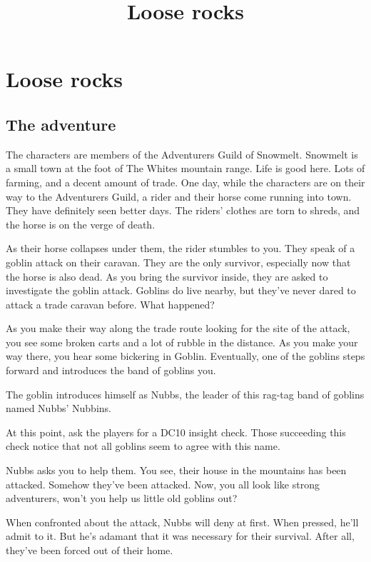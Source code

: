 \documentclass[10pt,twoside,twocolumn,openany,nodeprecatedcode,a4paper,bg=none]{dndbook}
\title{Loose rocks}
\begin{document}
\section{Loose rocks}
\subsection{The adventure}
The characters are members of the Adventurers Guild of Snowmelt. Snowmelt is a
small town at the foot of The Whites mountain range. Life is good here. Lots of
farming, and a decent amount of trade. One day, while the characters are on
their way to the Adventurers Guild, a rider and their horse come running into
town. They have definitely seen better days. The riders' clothes are torn to
shreds, and the horse is on the verge of death.

\begin{DndReadAloud}
  As their horse collapses under them, the rider stumbles to you. They speak of
  a goblin attack on their caravan. They are the only survivor, especially now
  that the horse is also dead. As you bring the survivor inside, they are asked
  to investigate the goblin attack. Goblins do live nearby, but they've never
  dared to attack a trade caravan before. What happened?

  As you make their way along the trade route looking for the site of the
  attack, you see some broken carts and a lot of rubble in the distance. As you
  make your way there, you hear some bickering in Goblin. Eventually, one of 
  the goblins steps forward and introduces the band of goblins you.

  The goblin introduces himself as Nubbs, the leader of this rag-tag band of
  goblins named Nubbs' Nubbins. 
\end{DndReadAloud}

At this point, ask the players for a DC10 insight check. Those succeeding this
check notice that not all goblins seem to agree with this name.

\begin{DndReadAloud}
  Nubbs asks you to help them. You see, their house in the mountains has been
  attacked. Somehow they've been attacked. Now, you all look like strong
  adventurers, won't you help us little old goblins out?
\end{DndReadAloud}

When confronted about the attack, Nubbs will deny at first. When pressed, he'll
admit to it. But he's adamant that it was necessary for their survival. After
all, they've been forced out of their home.
\end{document}
